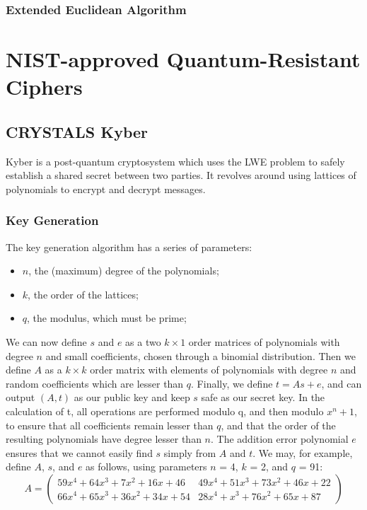 \documentclass{article}
\begin{document}
\subsubsection{Extended Euclidean Algorithm}

\section{NIST-approved Quantum-Resistant Ciphers}
\subsection{CRYSTALS Kyber}
Kyber is a post-quantum cryptosystem which uses the LWE problem to safely establish a shared secret between two parties.
It revolves around using lattices of polynomials to encrypt and decrypt messages.

\subsubsection{Key Generation}
The key generation algorithm has a series of parameters:
\begin{itemize}
   \item $n$, the (maximum) degree of the polynomials;
   \item $k$, the order of the lattices;
   \item $q$, the modulus, which must be prime;
\end{itemize}
We can now define $s$ and $e$ as a two $k \times 1$ order matrices of polynomials with degree $n$ and small coefficients,
chosen through a binomial distribution.
Then we define $A$ as a $k \times k$ order matrix with elements of polynomials with degree $n$ and random coefficients which are lesser than $q$.
Finally, we define $t = As + e$, and can output $(A, t)$ as our public key and keep $s$ safe as our secret key.
In the calculation of t, all operations are performed modulo q, and then modulo $x^{n} + 1$, to ensure that all coefficients remain lesser than $q$,
and that the order of the resulting polynomials have degree lesser than $n$.
The addition error polynomial $e$ ensures that we cannot easily find $s$ simply from $A$ and $t$.
\medskip
We may, for example, define $A$, $s$, and $e$ as follows, using parameters $n$ = 4, $k$ = 2, and $q$ = 91:
\[ A = \begin{pmatrix}
         59x^4 + 64x^3 + 7x^2 + 16x + 46 & 49x^4 + 51x^3 + 73x^2 + 46x + 22 \\
         66x^4 + 65x^3 + 36x^2 + 34x + 54 & 28x^4 + x^3 + 76x^2 + 65x + 87
       \end{pmatrix}
\]
\end{document}
